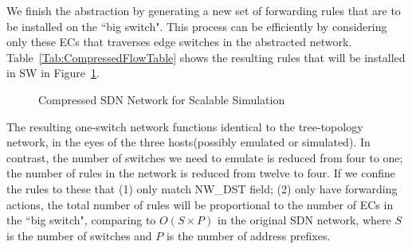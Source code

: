 We finish the abstraction by generating a new set of forwarding rules that are to be
installed on the ``big switch".
This process can be efficiently by considering only these ECs that
traverses edge switches in the abstracted network.
Table~\ref{Tab:CompressedFlowTable} shows the resulting rules that will be installed in
SW in Figure~\ref{Fig:ExampleBigSwitch}.

\begin{figure}[t]
\centering
{}
\caption{Compressed SDN Network for Scalable Simulation}
\label{Fig:ExampleBigSwitch}
\end{figure}

The resulting one-switch network functions identical to the tree-topology network,
in the eyes of the three hosts(possibly emulated or simulated).
In contrast, the number of switches we need to emulate is reduced from four to one;
the number of rules in the network is reduced from twelve to four.
If we confine the rules to these that (1) only match NW\_DST field;
(2) only have forwarding actions,
the total number of rules will be proportional to the number of ECs in the
``big switch", comparing to $O(S\times P)$ in the original SDN network,
where $S$ is the number of switches and $P$ is the number of address prefixes.


